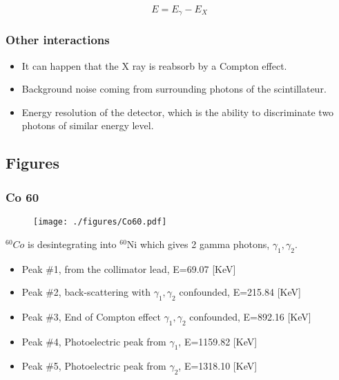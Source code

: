 \documentclass[a4paper,12pt,oneside]{article}
\begin{document}
$$E=E_{\gamma}-E_{X}$$

\subsubsection{Other interactions}
\begin{itemize}
\item It can happen that the X ray is reabsorb by a Compton effect.
\item Background noise coming from surrounding photons of the scintillateur.
\item Energy resolution of the detector, which is the ability to discriminate two photons of similar energy level.
\end{itemize}

\newpage
\subsection{Figures}
\begin{comment}
\subsubsection{Co 57}
\begin{figure}[h!]
  \begin{center}
  \texttt{[image: ./figures/Co57.pdf]}
  \caption{} \label{fig:Co57}
  \end{center}
\end{figure}


\newpage
\end{comment}
\subsubsection{Co 60}
\begin{figure}[h!]
  \begin{center}
  \texttt{[image: ./figures/Co60.pdf]}
  \caption{} \label{fig:Co60}
  \end{center}
\end{figure}

$^{60}Co$ is desintegrating into $^{60}$Ni which gives 2 gamma photons, $\gamma_1,\gamma_2$.

\begin{itemize}
\item Peak \#1, from the collimator lead, E=69.07 [KeV]
\item Peak \#2, back-scattering with $\gamma_1,\gamma_2$ confounded, E=215.84 [KeV]
\item Peak \#3, End of Compton effect $\gamma_1,\gamma_2$ confounded, E=892.16 [KeV]
\item Peak \#4, Photoelectric peak from $\gamma_1$, E=1159.82 [KeV]
\item Peak \#5, Photoelectric peak from $\gamma_2$, E=1318.10 [KeV]
\end{itemize}
\end{document}
